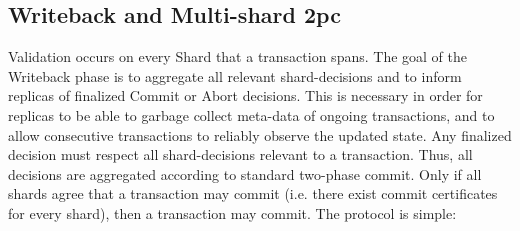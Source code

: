  

\subsection{Writeback and Multi-shard 2pc}

Validation occurs on every Shard that a transaction spans. The goal of the Writeback phase is to aggregate all relevant shard-decisions and to inform replicas of finalized Commit or Abort decisions. This is necessary in order for replicas to be able to garbage collect meta-data of ongoing transactions, and to allow consecutive transactions to reliably observe the updated state. Any finalized decision must respect all shard-decisions relevant to a transaction. Thus, all decisions are aggregated according to standard two-phase commit. Only if all shards agree that a transaction may commit (i.e. there exist commit certificates for every shard), then a transaction may commit. The protocol is simple:

